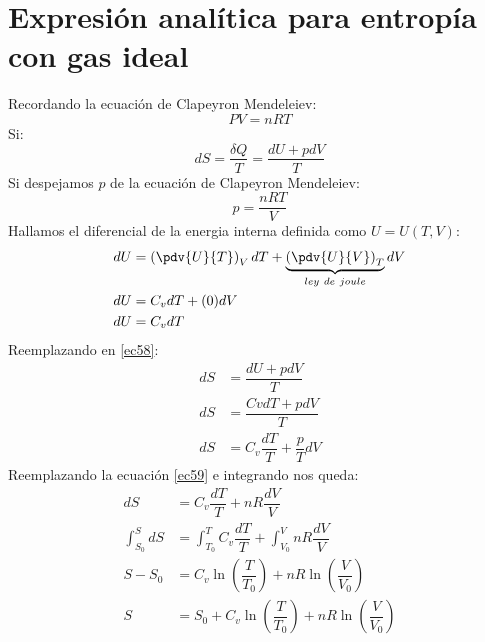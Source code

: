 \documentclass[../main]{subfiles}
\begin{document}
\section{Expresión analítica para entropía con gas ideal}
Recordando la ecuación de Clapeyron Mendeleiev:
\begin{equation}
    PV=nRT
\end{equation}
Si:
\begin{equation}
    dS= \dfrac{\delta Q}{T}=\dfrac{dU+pdV}{T}
    \label{ec58}
\end{equation}
Si despejamos $p$ de la ecuación de Clapeyron Mendeleiev:
\begin{equation}
    p=\dfrac{nRT}{V}
    \label{ec59}
\end{equation}
Hallamos el diferencial de la energia interna definida como $U=U(T,V)$:
\begin{align}
    dU & =\left( \pdv{U}{T}\right)_V dT+\underbrace{\left( \pdv{U}{V}\right)_T}_{ley \ de \ joule} dV \\
    dU & =C_v dT+(0)dV                                                                                \\
    dU & =C_v dT
    \label{ec62}
\end{align}
Reemplazando en \eqref{ec58}:
\begin{align}
    dS & =\dfrac{dU+pdV}{T}                \\
    dS & =\dfrac{Cv dT+pdV}{T}             \\
    dS & =C_v \dfrac{dT}{T}+\dfrac{p}{T}dV
\end{align}
Reemplazando la ecuación \eqref{ec59} e integrando nos queda:
\begin{align}
    dS               & =C_v \dfrac{dT}{T}+nR \dfrac{dV}{V}                                           \\
    \int_{S_0}^{S}dS & =\int_{T_0}^{T}C_v \dfrac{dT}{T}+\int_{V_0}^V nR \dfrac{dV}{V}                \\
    S-S_0            & =C_v \ln{\left(\dfrac{T}{T_0}\right)}+nR \ln{\left(\dfrac{V}{V_0}\right)}     \\
    S                & =S_0+C_v \ln{\left(\dfrac{T}{T_0}\right)}+nR \ln{\left(\dfrac{V}{V_0}\right)}
\end{align}
\end{document}
